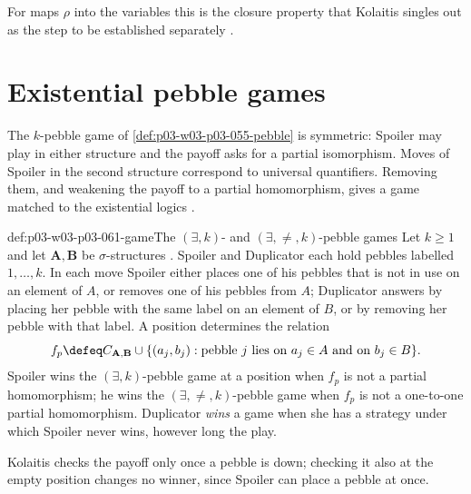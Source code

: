 For maps \(\rho\) into the variables this is the closure property that
Kolaitis singles out as the step to be established separately
\cite[p.~70]{Kolaitis2003ExpressivePowerNotes}.

\section{Existential pebble games}
\label{sec:p03-w03-p03-061-games}

The \(k\)-pebble game of \cref{def:p03-w03-p03-055-pebble} is symmetric:
Spoiler may play in either structure and the payoff asks for a partial
isomorphism. Moves of Spoiler in the second structure correspond to universal
quantifiers. Removing them, and weakening the payoff to a partial
homomorphism, gives a game matched to the existential logics
\cite[p.~71]{Kolaitis2003ExpressivePowerNotes}.

\begin{hbdefinition}{def:p03-w03-p03-061-game}{The \((\exists,k)\)- and \((\exists,\neq,k)\)-pebble games}
Let \(k\ge1\) and let \(\mathbf A,\mathbf B\) be \(\sigma\)-structures
\cite[Def.~8.4, pp.~71--72]{Kolaitis2003ExpressivePowerNotes}. Spoiler and
Duplicator each hold pebbles labelled \(1,\ldots,k\). In each move Spoiler
either places one of his pebbles that is not in use on an element of
\(A\), or removes one of his pebbles from \(A\); Duplicator answers by
placing her pebble with the same label on an element of \(B\), or by
removing her pebble with that label. A position determines the relation
\[
 f_p\defeq C_{\mathbf A,\mathbf B}\cup\{(a_j,b_j):\text{pebble }j
 \text{ lies on }a_j\in A\text{ and on }b_j\in B\}.
\]
Spoiler wins the \((\exists,k)\)-pebble game at a position when \(f_p\) is
not a partial homomorphism; he wins the \((\exists,\neq,k)\)-pebble game when
\(f_p\) is not a one-to-one partial homomorphism. Duplicator \emph{wins} a
game when she has a strategy under which Spoiler never wins, however long the
play.
\end{hbdefinition}

Kolaitis checks the payoff only once a pebble is down; checking it also at the
empty position changes no winner, since Spoiler can place a pebble at once.

